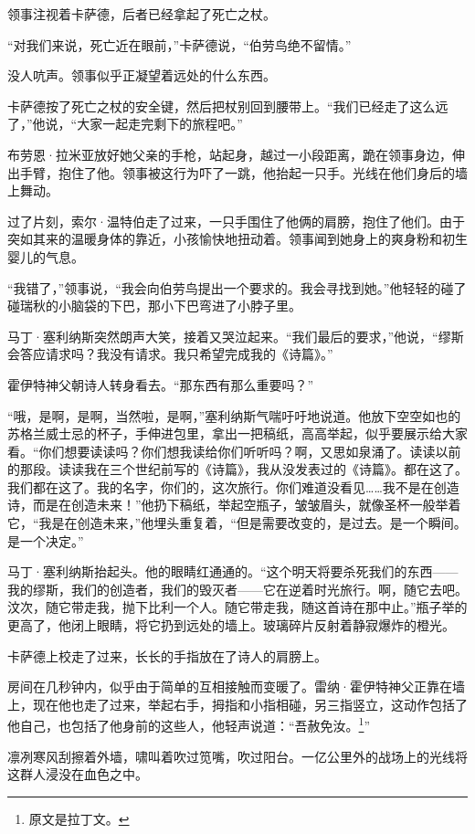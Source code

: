 \documentclass[AutoFakeBold=true]{book}
\begin{document}
领事注视着卡萨德，后者已经拿起了死亡之杖。

``对我们来说，死亡近在眼前，''卡萨德说，``伯劳鸟绝不留情。''

没人吭声。领事似乎正凝望着远处的什么东西。

卡萨德按了死亡之杖的安全键，然后把杖别回到腰带上。``我们已经走了这么远了，''他说，``大家一起走完剩下的旅程吧。''

布劳恩·拉米亚放好她父亲的手枪，站起身，越过一小段距离，跪在领事身边，伸出手臂，抱住了他。领事被这行为吓了一跳，他抬起一只手。光线在他们身后的墙上舞动。

过了片刻，索尔·温特伯走了过来，一只手围住了他俩的肩膀，抱住了他们。由于突如其来的温暖身体的靠近，小孩愉快地扭动着。领事闻到她身上的爽身粉和初生婴儿的气息。

``我错了，''领事说，``我会向伯劳鸟提出一个要求的。我会寻找到她。''他轻轻的碰了碰瑞秋的小脑袋的下巴，那小下巴弯进了小脖子里。

马丁·塞利纳斯突然朗声大笑，接着又哭泣起来。``我们最后的要求，''他说，``缪斯会答应请求吗？我没有请求。我只希望完成我的《诗篇》。''

霍伊特神父朝诗人转身看去。``那东西有那么重要吗？''

``哦，是啊，是啊，当然啦，是啊，''塞利纳斯气喘吁吁地说道。他放下空空如也的苏格兰威士忌的杯子，手伸进包里，拿出一把稿纸，高高举起，似乎要展示给大家看。``你们想要读读吗？你们想我读给你们听听吗？啊，又思如泉涌了。读读以前的那段。读读我在三个世纪前写的《诗篇》，我从没发表过的《诗篇》。都在这了。我们都在这了。我的名字，你们的，这次旅行。你们难道没看见……我不是在创造诗，而是在创造未来！''他扔下稿纸，举起空瓶子，皱皱眉头，就像圣杯一般举着它，``我是在创造未来，''他埋头重复着，``但是需要改变的，是过去。是一个瞬间。是一个决定。''

马丁·塞利纳斯抬起头。他的眼睛红通通的。``这个明天将要杀死我们的东西——我的缪斯，我们的创造者，我们的毁灭者——它在逆着时光旅行。啊，随它去吧。汶次，随它带走我，抛下比利一个人。随它带走我，随这首诗在那中止。''瓶子举的更高了，他闭上眼睛，将它扔到远处的墙上。玻璃碎片反射着静寂爆炸的橙光。

卡萨德上校走了过来，长长的手指放在了诗人的肩膀上。

房间在几秒钟内，似乎由于简单的互相接触而变暖了。雷纳·霍伊特神父正靠在墙上，现在他也走了过来，举起右手，拇指和小指相碰，另三指竖立，这动作包括了他自己，也包括了他身前的这些人，他轻声说道：``{\kaishu 吾赦免汝。}\footnote{原文是拉丁文。}''

凛冽寒风刮擦着外墙，啸叫着吹过笕嘴，吹过阳台。一亿公里外的战场上的光线将这群人浸没在血色之中。
\end{document}
